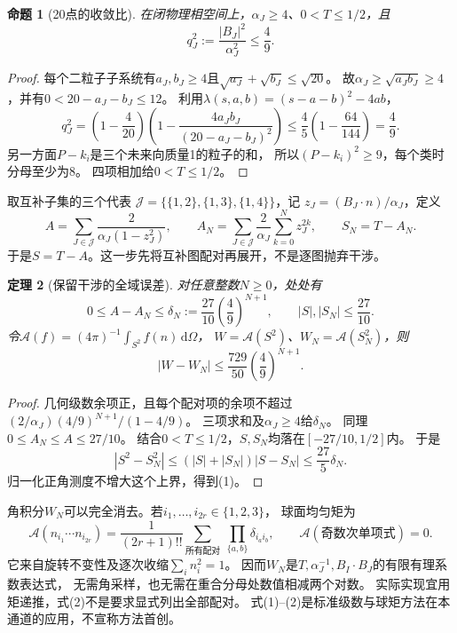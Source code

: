 \documentclass[11pt,a4paper]{ctexart}
\theoremstyle{cnplain}\newtheorem{proposition}{命题}[section]
\newtheorem{theorem}[proposition]{定理}
\newcommand{\cA}{\mathcal A}
\newcommand{\dd}{\,\mathrm d}
\begin{document}
\begin{proposition}[20点的收敛比]\label{prop:ratio}
在闭物理相空间上，$\alpha_J\ge4$、$0<T\le1/2$，且
\[
 q_J^2:=\frac{|B_J|^2}{\alpha_J^2}\le\frac49.
\]
\end{proposition}
\begin{proof}
每个二粒子子系统有$a_J,b_J\ge4$且$\sqrt{a_J}+\sqrt{b_J}\le\sqrt{20}$。
故$\alpha_J\ge\sqrt{a_Jb_J}\ge4$，并有$0<20-a_J-b_J\le12$。
利用$\lambda(s,a,b)=(s-a-b)^2-4ab$，
\[
 q_J^2=\left(1-\frac4{20}\right)
 \left(1-\frac{4a_Jb_J}{(20-a_J-b_J)^2}\right)
 \le\frac45\left(1-\frac{64}{144}\right)=\frac49.
\]
另一方面$P-k_i$是三个未来向质量1的粒子的和，
所以$(P-k_i)^2\ge9$，每个类时分母至少为8。
四项相加给$0<T\le1/2$。
\end{proof}

取互补子集的三个代表
$\mathcal J=\{\{1,2\},\{1,3\},\{1,4\}\}$，记
$z_J=(B_J\cdot n)/\alpha_J$，定义
\[
 A=\sum_{J\in\mathcal J}\frac{2}{\alpha_J(1-z_J^2)},\qquad
 A_N=\sum_{J\in\mathcal J}\frac2{\alpha_J}
             \sum_{k=0}^N z_J^{2k},\qquad S_N=T-A_N.
\]
于是$S=T-A$。这一步先将互补图配对再展开，不是逐图抛弃干涉。

\begin{theorem}[保留干涉的全域误差]\label{thm:tail}
对任意整数$N\ge0$，处处有
\[
 0\le A-A_N\le\delta_N:=\frac{27}{10}\left(\frac49\right)^{N+1},
 \qquad |S|,|S_N|\le\frac{27}{10}.
\]
令$\cA(f)=(4\pi)^{-1}\int_{S^2}f(n)\dd\Omega$，
$W=\cA(S^2)$、$W_N=\cA(S_N^2)$，则
\[
 |W-W_N|\le\frac{729}{50}\left(\frac49\right)^{N+1}.       \tag{1}
\]
\end{theorem}
\begin{proof}
几何级数余项正，且每个配对项的余项不超过
$(2/\alpha_J)(4/9)^{N+1}/(1-4/9)$。
三项求和及$\alpha_J\ge4$给$\delta_N$。
同理$0\le A_N\le A\le27/10$。
结合$0<T\le1/2$，$S,S_N$均落在$[-27/10,1/2]$内。
于是
\[
 |S^2-S_N^2|\le(|S|+|S_N|)|S-S_N|
 \le\frac{27}{5}\delta_N.
\]
归一化正角测度不增大这个上界，得到(1)。
\end{proof}

角积分$W_N$可以完全消去。若$i_1,\ldots,i_{2r}\in\{1,2,3\}$，
球面均匀矩为
\[
 \cA(n_{i_1}\cdots n_{i_{2r}})
 =\frac1{(2r+1)!!}
   \sum_{\text{所有配对}}\ \prod_{\{a,b\}}\delta_{i_ai_b},
 \qquad \cA(\text{奇数次单项式})=0.                       \tag{2}
\]
它来自旋转不变性及逐次收缩$\sum_i n_i^2=1$。
因而$W_N$是$T,\alpha_J^{-1},B_I\cdot B_J$的有限有理系数表达式，
无需角采样，也无需在重合分母处数值相减两个对数。
实际实现宜用矩递推，式(2)不是要求显式列出全部配对。
式(1)--(2)是标准级数与球矩方法在本通道的应用，不宣称方法首创。
\end{document}
